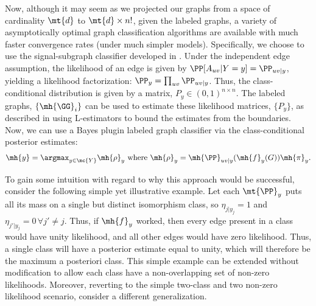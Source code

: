 \documentclass[10pt,journal,cspaper,compsoc]{IEEEtran}
\begin{document}
Now, although it may seem as we projected our graphs from a space of cardinality $\mt{d}$ to $\mt{d} \times n!$, given the labeled graphs, a variety of asymptotically optimal graph classification algorithms are available with much faster convergence rates (under much simpler models).  Specifically, we choose to use the signal-subgraph classifier developed in \cite{VP11sigsub}.  Under the independent edge assumption, the likelihood of an edge is given by $\PP[A_{uv}|Y=y]=\PP_{uv|y}$, yielding a likelihood factorization: $\PP_y=\prod_{uv}\PP_{uv|y}$. Thus, the class-conditional distribution is given by a matrix, $P_y \in (0,1)^{n \times n}$.   The labeled graphs, $\{\mh{\GG}_i\}$ can be used to estimate these likelihood matrices, $\{P_y\}$, as described in \cite{VP11sigsub} using L-estimators to bound the estimates from the boundaries.   Now, we can use a Bayes plugin labeled graph classifier via the class-conditional posterior estimates:
\begin{align}
	\mh{y}=\argmax_{y \in \mc{Y}} \mh{\rho}_y 
	\text{ where } \mh{\rho}_y=\mh{\PP}_{uv|y}(\mh{f}_y(G)) \mh{\pi}_y.
\end{align}


To gain some intuition with regard to why this approach would be successful, consider the following simple yet illustrative example.  Let each $\mt{\PP}_y$ puts all its mass on a single but distinct isomorphism class, so $\eta_{j|y_j}=1$ and $\eta_{j'|y_j}=0 \, \forall j' \neq j$.  Thus, if $\mh{f}_y$ worked, then every edge present in a class would have unity likelihood, and all other edges would have zero likelihood.  Thus, a single class will have a posterior estimate equal to unity, which will therefore be the maximum a posteriori class.  This simple example can be extended without modification
to allow each class have a non-overlapping set of non-zero likelihoods.  Moreover, reverting to the simple two-class and two non-zero likelihood scenario, consider a different generalization.  %




\end{document}
